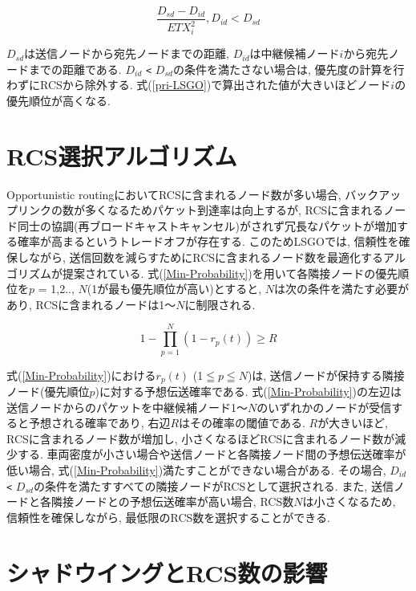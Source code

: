 \documentclass[10pt]{jreport}
\begin{document}
\begin{equation}
	\label{pri-LSGO}
	\frac{D_{sd} - D_{id}}{ETX_{i}^{2}} ,   D_{id} < D_{sd}
\end{equation}

$D_{sd}$は送信ノードから宛先ノードまでの距離, $D_{id}$は中継候補ノード$i$から宛先ノードまでの距離である.  $D_{id}$ \verb|<| $D_{sd}$の条件を満たさない場合は, 優先度の計算を行わずにRCSから除外する.
式(\ref{pri-LSGO})で算出された値が大きいほどノード$i$の優先順位が高くなる. 

\section{RCS選択アルゴリズム}
Opportunistic routingにおいてRCSに含まれるノード数が多い場合, バックアップリンクの数が多くなるためパケット到達率は向上するが, RCSに含まれるノード同士の協調(再ブロードキャストキャンセル)がされず冗長なパケットが増加する確率が高まるというトレードオフが存在する.  
このためLSGOでは, 信頼性を確保しながら, 送信回数を減らすためにRCSに含まれるノード数を最適化するアルゴリズムが提案されている.  
式(\ref{Min-Probability})を用いて各隣接ノードの優先順位を$p$ = 1,2.., $N$(1が最も優先順位が高い)とすると, $N$は次の条件を満たす必要があり, RCSに含まれるノードは1～$N$に制限される. 

\begin{equation}
	\label{Min-Probability}
	1 - \prod_{p=1}^N (1 - r_{p}(t))\geq R
\end{equation}

式(\ref{Min-Probability})における$r_{p}(t)$ (1$ \leqq $$p$$ \leqq $$N$)は, 送信ノードが保持する隣接ノード(優先順位$p$)に対する予想伝送確率である. 
式(\ref{Min-Probability})の左辺は送信ノードからのパケットを中継候補ノード1～$N$のいずれかのノードが受信すると予想される確率であり, 右辺$R$はその確率の閾値である. $R$が大きいほど, RCSに含まれるノード数が増加し, 小さくなるほどRCSに含まれるノード数が減少する. 車両密度が小さい場合や送信ノードと各隣接ノード間の予想伝送確率が低い場合, 式(\ref{Min-Probability})満たすことができない場合がある. その場合, $D_{id}$ \verb|<| $D_{sd}$の条件を満たすすべての隣接ノードがRCSとして選択される. また, 送信ノードと各隣接ノードとの予想伝送確率が高い場合, RCS数$N$は小さくなるため, 信頼性を確保しながら, 最低限のRCS数を選択することができる. 


\section{シャドウイングとRCS数の影響}
\label{LSGO_evaluation}
\end{document}
